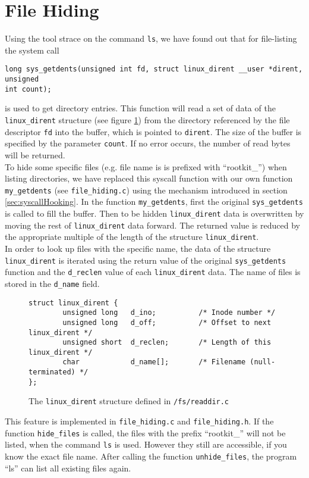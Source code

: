 \section{File Hiding}
Using the tool strace on the command \texttt{ls}, we have found out that for file-listing the system call 
\begin{center}
\lstset{escapechar=,style=customc}
\begin{lstlisting}
long sys_getdents(unsigned int fd, struct linux_dirent __user *dirent, unsigned 
int count);
\end{lstlisting}
\end{center}
is used to get directory entries. This function will read a set of data of the \verb+linux_dirent+ structure (see figure \ref{ls:dirent}) from the directory referenced by the file descriptor \texttt{fd} into the buffer, which is pointed to \texttt{dirent}. The size of the buffer is specified by the parameter \texttt{count}. If no error occurs, the number of read bytes will be returned.\\
To hide some specific files (e.g. file name is is prefixed with ``rootkit\_'') when listing directories, we have replaced this syscall function with our own function \verb+my_getdents+ (see \verb+file_hiding.c+) using the mechanism introduced in section \ref{sec:syscallHooking}. In the function \verb+my_getdents+, first the original \verb+sys_getdents+ is called to fill the buffer. Then to be hidden \verb+linux_dirent+ data is overwritten by moving the rest of \verb+linux_dirent+ data forward. The returned value is reduced by the appropriate multiple of the length of the structure \verb+linux_dirent+.\\ 
In order to look up files with the specific name, the data of the structure \verb+linux_dirent+ is iterated using the return value of the original \verb+sys_getdents+ function and the \verb+d_reclen+ value of each \verb+linux_dirent+ data. The name of files is stored in the \verb+d_name+ field. 
\begin{center}
\begin{figure}[h]
\lstset{escapechar=,style=customc}
\begin{lstlisting}
struct linux_dirent {
        unsigned long   d_ino;		 	/* Inode number */
        unsigned long   d_off;  		/* Offset to next linux_dirent */
        unsigned short  d_reclen;		/* Length of this linux_dirent */
        char            d_name[];		/* Filename (null-terminated) */
};
\end{lstlisting}
\caption{The \texttt{linux\_dirent} structure defined in \texttt{/fs/readdir.c}}
\label{ls:dirent}
\end{figure}
\end{center}
This feature is implemented in \verb+file_hiding.c+ and \verb+file_hiding.h+. If the function \verb+hide_files+ is called, the files with the prefix ``rootkit\_'' will not be listed, when the command \texttt{ls} is used. However they still are accessible, if you know the exact file name. After calling the function \verb+unhide_files+, the program ``ls'' can list all existing files again. 
